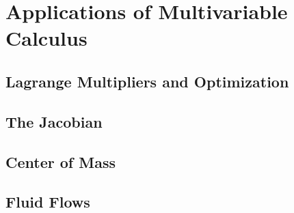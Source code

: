 \chapter{Applications of Multivariable Calculus}

\section{Lagrange Multipliers and Optimization}

\section{The Jacobian}

\section{Center of Mass}

\section{Fluid Flows}

